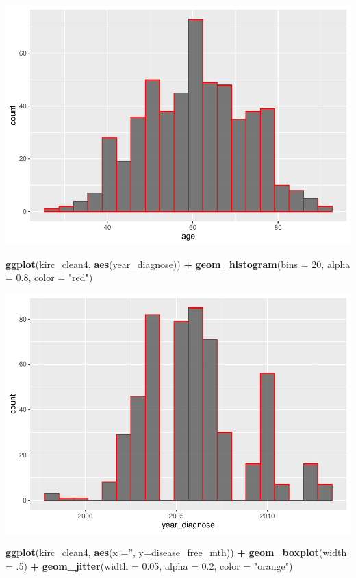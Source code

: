 \documentclass[]{article}
\newenvironment{Shaded}{\begin{snugshade}}{\end{snugshade}}
\newcommand{\KeywordTok}[1]{\textcolor[rgb]{0.13,0.29,0.53}{\textbf{#1}}}
\newcommand{\DataTypeTok}[1]{\textcolor[rgb]{0.13,0.29,0.53}{#1}}
\newcommand{\DecValTok}[1]{\textcolor[rgb]{0.00,0.00,0.81}{#1}}
\newcommand{\FloatTok}[1]{\textcolor[rgb]{0.00,0.00,0.81}{#1}}
\newcommand{\StringTok}[1]{\textcolor[rgb]{0.31,0.60,0.02}{#1}}
\newcommand{\OperatorTok}[1]{\textcolor[rgb]{0.81,0.36,0.00}{\textbf{#1}}}
\newcommand{\NormalTok}[1]{#1}
\begin{document}
\includegraphics{figs/render-unnamed-chunk-18-1.pdf}

\begin{Shaded}
\begin{Highlighting}[]
\KeywordTok{ggplot}\NormalTok{(kirc_clean4, }\KeywordTok{aes}\NormalTok{(year_diagnose)) }\OperatorTok{+}
\StringTok{     }\KeywordTok{geom_histogram}\NormalTok{(}\DataTypeTok{bins =} \DecValTok{20}\NormalTok{, }\DataTypeTok{alpha =} \FloatTok{0.8}\NormalTok{, }\DataTypeTok{color =} \StringTok{"red"}\NormalTok{)}
\end{Highlighting}
\end{Shaded}

\includegraphics{figs/render-unnamed-chunk-19-1.pdf}

\begin{Shaded}
\begin{Highlighting}[]
\KeywordTok{ggplot}\NormalTok{(kirc_clean4, }\KeywordTok{aes}\NormalTok{(}\DataTypeTok{x =}\StringTok{''}\NormalTok{, }\DataTypeTok{y=}\NormalTok{disease_free_mth)) }\OperatorTok{+}
\StringTok{     }\KeywordTok{geom_boxplot}\NormalTok{(}\DataTypeTok{width =}\NormalTok{ .}\DecValTok{5}\NormalTok{) }\OperatorTok{+}
\StringTok{     }\KeywordTok{geom_jitter}\NormalTok{(}\DataTypeTok{width =} \FloatTok{0.05}\NormalTok{, }\DataTypeTok{alpha =} \FloatTok{0.2}\NormalTok{, }\DataTypeTok{color =} \StringTok{"orange"}\NormalTok{)}
\end{Highlighting}
\end{Shaded}
\end{document}
